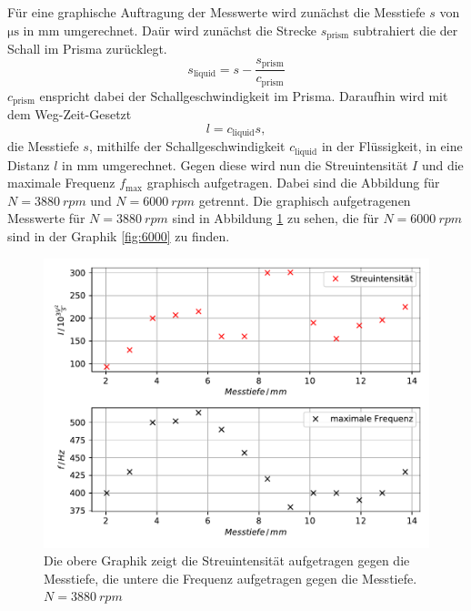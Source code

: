 Für eine graphische Auftragung der Messwerte wird zunächst die Messtiefe $s$ von $\si{\micro\second}$ in $\si{\milli\meter}$ umgerechnet.
Daür wird zunächst die Strecke $s_\text{prism}$ subtrahiert die der Schall im Prisma zurücklegt.
\begin{equation*}
 s_\text{liquid} = s - \frac{s_\text{prism}}{c_\text{prism}}
\end{equation*}
$c_\text{prism}$ enspricht dabei der Schallgeschwindigkeit im Prisma.
Daraufhin wird mit dem Weg-Zeit-Gesetzt
\begin{equation*}
l = c_\text{liquid} s,
\end{equation*}
die Messtiefe $s$, mithilfe der Schallgeschwindigkeit $c_\text{liquid}$ in der Flüssigkeit, in eine Distanz $l$ in $\si{\milli\meter}$ umgerechnet.
Gegen diese wird nun die Streuintensität $I$ und die maximale Frequenz $f_\text{max}$ graphisch aufgetragen.
Dabei sind die Abbildung für $N = \SI{3880}{rpm}$ und $N = \SI{6000}{rpm}$ getrennt.
Die graphisch aufgetragenen Messwerte für $N = \SI{3880}{rpm}$ sind in Abbildung \ref{fig:3880} zu sehen, die für $N = \SI{6000}{rpm}$ sind in der Graphik \ref{fig:6000} zu finden.

\begin{figure}
    \centering
    \includegraphics[width=\textwidth]{content/data/depth_3880.pdf}
    \caption{Die obere Graphik zeigt die Streuintensität aufgetragen gegen die Messtiefe, die untere die Frequenz aufgetragen gegen die Messtiefe. $N=\SI{3880}{rpm}$}
    \label{fig:3880}
\end{figure}

